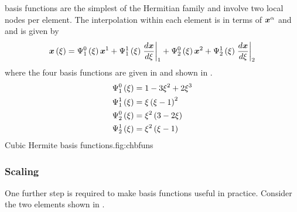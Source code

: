 \Cubicherm basis functions are the simplest of the Hermitian family and
involve two local nodes per element. The interpolation within each element is
in terms of $\nodept{\vect{x}}{\alpha}$ and 
and is given by 
\begin{equation}
  \fnof{\vect{x}}{\xi}=\chbfn{1}{0}{\xi}\nodept{\vect{x}}{1}+\chbfn{1}{1}{\xi}
  \evalat{\dby{\vect{x}}{\xi}}{1}+\chbfn{2}{0}{\xi}\nodept{\vect{x}}{2}+
  \chbfn{2}{1}{\xi}\evalat{\dby{\vect{x}}{\xi}}{2}
  \label{eqn:chxiinterpolation}
\end{equation}
where the four \onedal \cubicherm basis functions are given in 
 and shown in .
\begin{equation}
  \begin{split}
    \chbfn{1}{0}{\xi} &= 1-3\xi^{2}+2\xi^{3} \\
    \chbfn{1}{1}{\xi} &= \xi\pbrac{\xi-1}^{2} \\
    \chbfn{2}{0}{\xi} &= \xi^{2}\pbrac{3-2\xi} \\
    \chbfn{2}{1}{\xi} &= \xi^{2}\pbrac{\xi-1}
  \end{split}
  \label{eqn:chbfuns}
\end{equation}
{Cubic Hermite basis functions.}{fig:chbfuns}

\subsubsection{Scaling}

One further step is required to make \cubicherm basis functions useful in
practice.  Consider the two \cubicherm elements shown in
.


